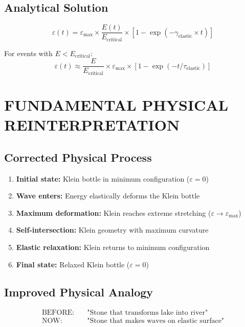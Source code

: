 \documentclass[12pt,a4paper]{article}
\begin{document}
\subsection{Analytical Solution}

\begin{equation}
\varepsilon(t) = \varepsilon_{\max} \times \frac{E(t)}{E_{\text{critical}}} \times [1 - \exp(-\gamma_{\text{elastic}} \times t)]
\end{equation}

For events with $E < E_{\text{critical}}$:
\begin{equation}
\varepsilon(t) \approx \frac{E}{E_{\text{critical}}} \times \varepsilon_{\max} \times [1 - \exp(-t/\tau_{\text{elastic}})]
\end{equation}

\section{FUNDAMENTAL PHYSICAL REINTERPRETATION}

\subsection{Corrected Physical Process}

\begin{enumerate}
\item \textbf{Initial state:} Klein bottle in minimum configuration ($\varepsilon = 0$)
\item \textbf{Wave enters:} Energy elastically deforms the Klein bottle
\item \textbf{Maximum deformation:} Klein reaches extreme stretching ($\varepsilon \to \varepsilon_{\max}$)
\item \textbf{Self-intersection:} Klein geometry with maximum curvature
\item \textbf{Elastic relaxation:} Klein returns to minimum configuration
\item \textbf{Final state:} Relaxed Klein bottle ($\varepsilon = 0$)
\end{enumerate}

\subsection{Improved Physical Analogy}

\begin{align}
\text{BEFORE:} &\quad \text{"Stone that transforms lake into river"}\\
\text{NOW:} &\quad \text{"Stone that makes waves on elastic surface"}
\end{align}
\end{document}
